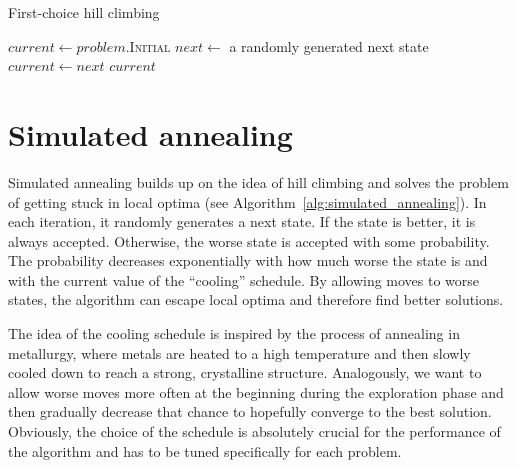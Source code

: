 \begin{algorithm}

\begin{algorithmic}
\caption{First-choice hill climbing} \label{alg:first_choice_hill_climbing}
\State $current \gets problem$.I\textsc{nitial}
    \State $next \gets$ a randomly generated next state
        \State $current \gets next$
    \EndIf
\EndFor
\State \Return $current$
\EndFunction
\end{algorithmic}
\end{algorithm}

\section{Simulated annealing} \label{sec:simulated_annealing}

Simulated annealing \cite{russell2020artificial, luke2013essentials} builds up on the idea of hill climbing and solves the problem of getting stuck in local optima (see Algorithm~\ref{alg:simulated_annealing}). In each iteration, it randomly generates a next state. If the state is better, it is always accepted. Otherwise, the worse state is accepted with some probability. The probability decreases exponentially with how much worse the state is and with the current value of the ``cooling'' schedule. By allowing moves to worse states, the algorithm can escape local optima and therefore find better solutions.

The idea of the cooling schedule is inspired by the process of annealing in metallurgy, where metals are heated to a high temperature and then slowly cooled down to reach a strong, crystalline structure. Analogously, we want to allow worse moves more often at the beginning during the exploration phase and then gradually decrease that chance to hopefully converge to the best solution. Obviously, the choice of the schedule is absolutely crucial for the performance of the algorithm and has to be tuned specifically for each problem.

